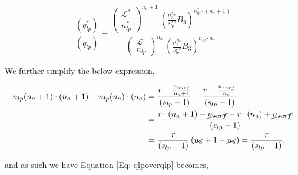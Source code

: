 \documentclass[12pt,letterpaper]{article}
\newcommand{\leng}{\mathcal{L}}
\newcommand{\lr}[1]{\left( #1 \right)}
\begin{document}
\begin{equation}
\frac{
    \lr{
        q_{lp}^{*}
    }
}{
    \lr{
        q_{lp}
    }
}
=
\frac{
        \lr{
        \begin{array}{c}
             \leng^{*}\\
             n_{lp}^{*}
        \end{array}
        }^{n_a+1}   
        ~
        \lr{
                    \frac{
                        \mu_3^{
                            s_{lp}
                        }
                    }{
                        s_{lp}^{2.8}
                    }
                    B_3
                }
                ^{
                    n_{lp}^{*}\cdot (n_a+1)
                }
}{
        \lr{
        \begin{array}{c}
             \leng\\
             n_{lp} 
        \end{array}
        }^{n_a}   
        ~
        \lr{
                    \frac{
                        \mu_3^{
                            s_{lp}
                        }
                    }{
                        s_{lp}^{2.8}
                    }
                    B_3
                }
                ^{
                    n_{lp}\cdot n_a            
        }
}
\label{Eq: qlpoverqlp}
\end{equation}

We further simplify the below expression,


\begin{align}
n_{lp}(n_a+1)
\cdot
(n_a+1)
-
n_{lp}(n_a)
\cdot
(n_a)
&=
\frac{
    r
    -
    \frac{
            n_{surf}
        }{
            n_a+1
    }
}{
    (s_{lp}-1)
}
-
\frac{
    r
    -
    \frac{
        n_{surf}
    }{
        n_a
    }
}{
    (s_{lp}-1)
}\nonumber\\
&=
\frac{
    r\cdot (n_a+1)
    -
    \cancel{
        n_{surf}
    }
    -
    r\cdot (n_a)
    +
    \cancel{
        n_{surf}
    }
}{
    (s_{lp}-1)
} \\
&=
\frac{
    r
}{
    (s_{lp}-1)
}
\lr{
    \cancel{
        n_a
    }
    +
    1
    -
    \cancel{
        n_a
    }
}
=
\frac{
    r
}{
    (s_{lp}-1)
},\nonumber
\end{align}



and as such we have Equation \ref{Eq: qlpoverqlp} becomes,
\end{document}
